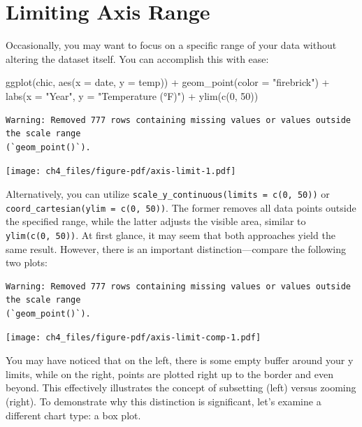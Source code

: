 \documentclass[
  letterpaper,
]{scrbook}
\newenvironment{Shaded}{\begin{snugshade}}{\end{snugshade}}
\newcommand{\AttributeTok}[1]{\textcolor[rgb]{0.40,0.45,0.13}{#1}}
\newcommand{\DecValTok}[1]{\textcolor[rgb]{0.68,0.00,0.00}{#1}}
\newcommand{\FunctionTok}[1]{\textcolor[rgb]{0.28,0.35,0.67}{#1}}
\newcommand{\NormalTok}[1]{\textcolor[rgb]{0.00,0.23,0.31}{#1}}
\newcommand{\SpecialCharTok}[1]{\textcolor[rgb]{0.37,0.37,0.37}{#1}}
\newcommand{\StringTok}[1]{\textcolor[rgb]{0.13,0.47,0.30}{#1}}
\begin{document}
\section{Limiting Axis Range}\label{limiting-axis-range}

Occasionally, you may want to focus on a specific range of your data
without altering the dataset itself. You can accomplish this with ease:

\begin{Shaded}
\begin{Highlighting}[]
\FunctionTok{ggplot}\NormalTok{(chic, }\FunctionTok{aes}\NormalTok{(}\AttributeTok{x =}\NormalTok{ date, }\AttributeTok{y =}\NormalTok{ temp)) }\SpecialCharTok{+}
  \FunctionTok{geom\_point}\NormalTok{(}\AttributeTok{color =} \StringTok{"firebrick"}\NormalTok{) }\SpecialCharTok{+}
  \FunctionTok{labs}\NormalTok{(}\AttributeTok{x =} \StringTok{"Year"}\NormalTok{, }\AttributeTok{y =} \StringTok{"Temperature (°F)"}\NormalTok{) }\SpecialCharTok{+}
  \FunctionTok{ylim}\NormalTok{(}\FunctionTok{c}\NormalTok{(}\DecValTok{0}\NormalTok{, }\DecValTok{50}\NormalTok{))}
\end{Highlighting}
\end{Shaded}

\begin{verbatim}
Warning: Removed 777 rows containing missing values or values outside the scale range
(`geom_point()`).
\end{verbatim}

\texttt{[image: ch4\_files/figure-pdf/axis-limit-1.pdf]}

Alternatively, you can utilize
\texttt{scale\_y\_continuous(limits\ =\ c(0,\ 50))} or
\texttt{coord\_cartesian(ylim\ =\ c(0,\ 50))}. The former removes all
data points outside the specified range, while the latter adjusts the
visible area, similar to \texttt{ylim(c(0,\ 50))}. At first glance, it
may seem that both approaches yield the same result. However, there is
an important distinction---compare the following two plots:

\begin{verbatim}
Warning: Removed 777 rows containing missing values or values outside the scale range
(`geom_point()`).
\end{verbatim}

\texttt{[image: ch4\_files/figure-pdf/axis-limit-comp-1.pdf]}

You may have noticed that on the left, there is some empty buffer around
your y limits, while on the right, points are plotted right up to the
border and even beyond. This effectively illustrates the concept of
subsetting (left) versus zooming (right). To demonstrate why this
distinction is significant, let's examine a different chart type: a box
plot.
\end{document}
